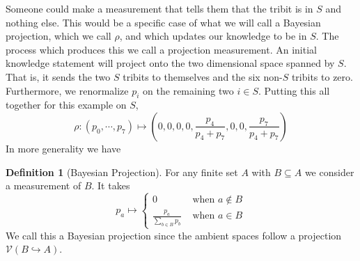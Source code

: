 \documentclass[12pt,a4paper]{article}
\theoremstyle{myrule}
\theoremstyle{postulate}
\theoremstyle{definition}
\newtheorem{definition}{Definition}[section]
\begin{document}
Someone could make a measurement that tells them that the tribit is in $S$ and nothing else.  This would be a specific case of what we will call a Bayesian projection, which we call $\rho$, and which updates our knowledge to be in $S$.  The process which produces this we call a projection measurement.  An initial knowledge statement will project onto the two dimensional space spanned by $S$.  That is, it sends the two $S$ tribits to themselves and the six non-$S$ tribits to zero.  Furthermore, we renormalize $p_i$ on the remaining two $i \in S$.  Putting this all together for this example on $S$, 
\begin{equation}
\label{sdist}
\rho: (p_0,\cdots,p_7) \mapsto \left(0,0,0,0, \frac{p_4}{p_4 + p_7},0,0,\frac{p_7}{p_4 + p_7}\right)
\end{equation}
In more generality we have
\begin{definition}[Bayesian Projection]
\label{projdef}
For any finite set $A$ with $B \subseteq A$ we consider a measurement of $B$.  It takes
\[
p_a \mapsto \left\{ \begin{array}{cc} 0 &\text{ when } a \not \in B \\ \frac{p_a}{\sum_{b \in B} p_b} & \text{ when } a \in B \end{array} \right.
\]
We call this a Bayesian projection since the ambient spaces follow a projection $\mathcal{V}(B \hookrightarrow A)$.
\end{definition}
\end{document}
